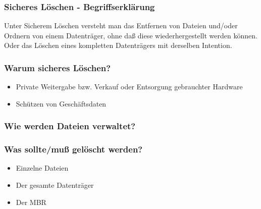 
\begin{frame}
\frametitle{Sicheres Löschen - Begriffserklärung}

Unter Sicherem Löschen versteht man das Entfernen von Dateien und/oder Ordnern von einem Datenträger, ohne daß diese wiederhergestellt werden können.\\ \pause
Oder das Löschen eines kompletten Datenträgers mit derselben Intention.
\end{frame}

\begin{frame}
  \frametitle{Warum sicheres Löschen?}
  \begin{itemize}
    \item Private Weitergabe bzw. Verkauf oder Entsorgung gebrauchter Hardware
    \item Schützen von Geschäftsdaten
  \end{itemize}
\end{frame}

\begin{frame}
  \frametitle{Wie werden Dateien verwaltet?}
\end{frame}

\begin{frame}
  \frametitle{Was sollte/muß gelöscht werden?}
  \begin{itemize}
    \item Einzelne Dateien
    \item Der gesamte Datenträger
    \item Der MBR
  \end{itemize}
\end{frame}

